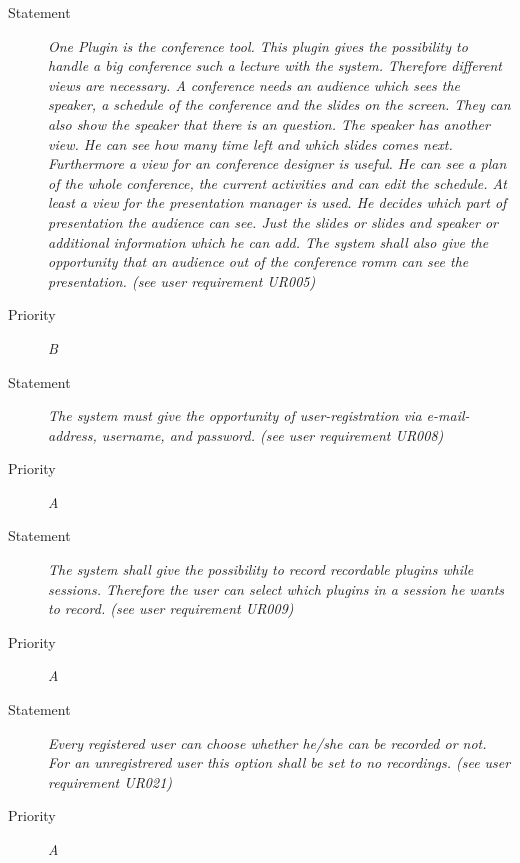 \FR
\begin{description}
  \item [Statement] 
    \textit{One Plugin is the conference tool. This plugin gives the possibility to handle a big conference such a lecture with the system. Therefore different views are necessary. A conference needs an audience which sees the speaker, a schedule of the conference and the slides on the screen. They can also show the speaker that there is an question. The speaker has another view. He can see how many time left and which slides comes next. Furthermore a view for an conference designer is useful. He can see a plan of the whole conference, the current activities and can edit the schedule.  At least a view for the presentation manager is used. He decides which part of presentation the audience can see. Just the slides or slides and speaker or additional information which he can add. The system shall also give the opportunity that an audience out of the conference romm can see the presentation.
		(see user requirement UR005)}
  \item [Priority] \textit{B}
\end{description}

\FR
\begin{description}
  \item [Statement] 
    \textit{The system must give the opportunity of user-registration via e-mail-address, username, and password.
    (see user requirement UR008)}
  \item [Priority] \textit{A}
\end{description}

\FR
\begin{description}
  \item [Statement] 
    \textit{The system shall give the possibility to record \gls{recordable plugins} while sessions. Therefore the user can select which plugins in a session he wants to record. 
    (see user requirement UR009)}
  \item [Priority] \textit{A}
\end{description}

\FR
\begin{description}
  \item [Statement] 
    \textit{Every registered user can choose whether he/she can be recorded or not. For an unregistrered user this option shall be set to no recordings.
    (see user requirement UR021)}
  \item [Priority] \textit{A}
\end{description}

